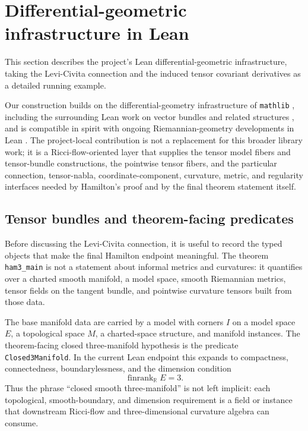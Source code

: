 \documentclass[11pt]{article}
\theoremstyle{plain}
\theoremstyle{definition}
\theoremstyle{remark}
\newcommand{\leanref}[1]{\nolinkurl{#1}}
\begin{document}
\section{Differential-geometric infrastructure in Lean}

This section describes the project's Lean differential-geometric infrastructure,
taking the Levi-Civita connection and the induced tensor covariant derivatives
as a detailed running example.

Our construction builds on the differential-geometry infrastructure of
\texttt{mathlib} \cite{mathlib}, including the surrounding Lean work on vector
bundles and related structures \cite{BordgCavalleriDGLean}, and is compatible in
spirit with ongoing Riemannian-geometry developments in Lean
\cite{RothgangDGMathlib}.  The project-local contribution is not a replacement
for this broader library work; it is a Ricci-flow-oriented layer that supplies
the tensor model fibers and tensor-bundle constructions, the pointwise tensor
fibers, and the particular connection, tensor-nabla, coordinate-component,
curvature, metric, and regularity interfaces needed by Hamilton's proof and by
the final theorem statement itself.

\subsection{Tensor bundles and theorem-facing predicates}

Before discussing the Levi-Civita connection, it is useful to record the typed
objects that make the final Hamilton endpoint meaningful.  The theorem
\leanref{ham3_main} is not a statement about informal metrics and curvatures:
it quantifies over a charted smooth manifold, a model space, smooth
Riemannian metrics, tensor fields on the tangent bundle, and pointwise
curvature tensors built from those data.

The base manifold data are carried by a model with corners \(I\) on a model
space \(E\), a topological space \(M\), a charted-space structure, and manifold
instances.  The theorem-facing closed three-manifold hypothesis is the
predicate \leanref{Closed3Manifold}.
In the current Lean endpoint this expands to compactness, connectedness,
boundarylessness, and the dimension condition
\[
  \operatorname{finrank}_{\mathbb R} E = 3 .
\]
Thus the phrase ``closed smooth three-manifold'' is not left implicit: each
topological, smooth-boundary, and dimension requirement is a field or instance
that downstream Ricci-flow and three-dimensional curvature algebra can consume.
\end{document}
